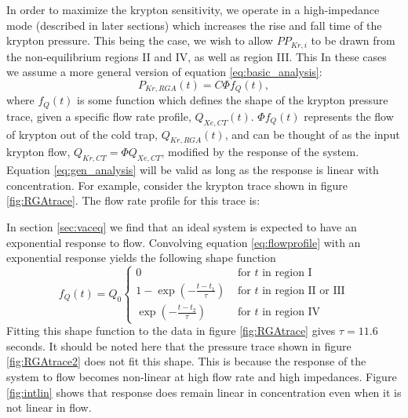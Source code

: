\documentclass[12pt]{article}
\begin{document}
In order to maximize the krypton sensitivity, we operate in a high-impedance mode (described in later sections) which increases the rise and fall time of the krypton pressure. This being the case, we wish to allow $PP_{Kr,i}$ to be drawn from the non-equilibrium regions II and IV, as well as region III. This In these cases we assume a more general version of equation \ref{eq:basic_analysis}:
\begin{equation}
\label{eq:gen_analysis}
P_{Kr,RGA}(t)=C\Phi f_{Q}(t),
\end{equation}
where $f_{Q}(t)$ is some function which defines the shape of the krypton pressure trace, given a specific flow rate profile, $Q_{Xe,CT}(t)$. $\Phi f_{Q}(t)$ represents the flow of krypton out of the cold trap, $Q_{Kr,RGA}(t)$, and can be thought of as the input krypton flow, $Q_{Kr,CT}=\Phi Q_{Xe,CT}$, modified by the response of the system. Equation \ref{eq:gen_analysis} will be valid as long as the response is linear with concentration. For example, consider the krypton trace shown in figure \ref{fig:RGAtrace}. The flow rate profile for this trace is:

In section \ref{sec:vaceq} we find that an ideal system is expected to have an exponential response to flow. Convolving equation \ref{eq:flowprofile} with an exponential response yields the following shape function
\begin{equation}
\label{eq:shapefunc}
f_Q(t) = Q_0
  \begin{cases}
    0&\textrm{ for $t$ in region I}\\
    1-\exp(-\frac{t-t_1}{\tau})&\textrm{ for $t$ in region II or III}\\
    \exp(-\frac{t-t_2}{\tau})&\textrm{ for $t$ in region IV}
  \end{cases}
\end{equation}
Fitting this shape function to the data in figure \ref{fig:RGAtrace} gives $\tau = 11.6$ seconds. It should be noted here that the pressure trace shown in figure \ref{fig:RGAtrace2} does not fit this shape. This is because the response of the system to flow becomes non-linear at high flow rate and high impedances. Figure \ref{fig:intlin} shows that response does remain linear in concentration even when it is not linear in flow.
\end{document}
